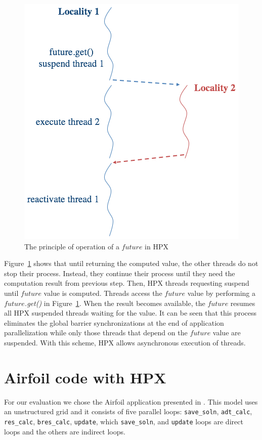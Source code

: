 \documentclass[conference]{IEEEtran}
\begin{document}
\begin{figure} [!h]
\captionsetup{justification=centering}
\begin{center}
\centering
\includegraphics[width=0.75\columnwidth]{Pictures/f4a.jpg}
\caption {The principle of operation of a \textit{$future$} in HPX}
\label{f4}
\end{center}
\end{figure}



Figure~\ref{f4} shows that until returning the computed value, the other threads do not stop their process. Instead, they continue their process until they need the computation result from previous step. Then, HPX threads requesting suspend until $future$ value is computed. Threads access the $future$ value by performing a \textit{$future$.get()} in Figure~\ref{f4}. When the result becomes available, the \textit{$future$} resumes all HPX suspended threads waiting for the value. It can be seen that this process eliminates the global barrier synchronizations at the end of application parallelization while only those threads that depend on the $future$ value are suspended. With this scheme, HPX allows asynchronous execution of threads.


\section{Airfoil code with HPX}
\label{sec:air}

For our evaluation we chose the Airfoil application presented in \cite{o8}. This model uses an unstructured grid and it consists of five parallel loops: \texttt{save\_soln}, \texttt{adt\_calc}, \texttt{res\_calc}, \texttt{bres\_calc}, \texttt{update}, which \texttt{save\_soln},  and \texttt{update} loops are direct loops and the others are indirect loops. 
\end{document}
